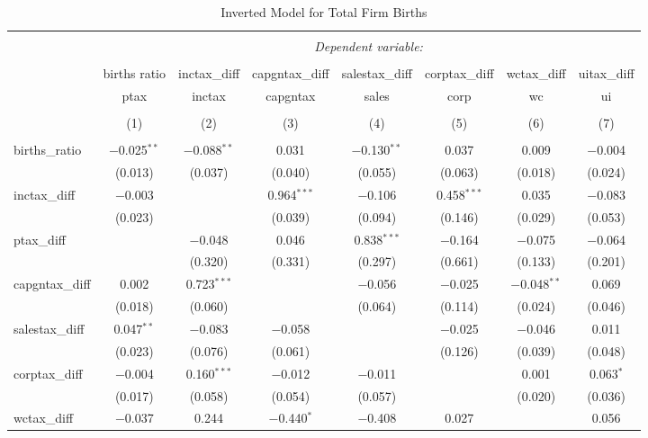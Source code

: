 
\begin{table}[!htbp] \centering 
  \caption{Inverted Model for  Total Firm Births} 
  \label{--rd} 
\footnotesize 
\begin{tabular}{@{\extracolsep{5pt}}lccccccc} 
\\[-1.8ex]\hline 
\hline \\[-1.8ex] 
 & \multicolumn{7}{c}{\textit{Dependent variable:}} \\ 
\cline{2-8} 
\\[-1.8ex] & births ratio & inctax\_diff & capgntax\_diff & salestax\_diff & corptax\_diff & wctax\_diff & uitax\_diff \\ 
 & ptax & inctax & capgntax & sales & corp & wc & ui \\ 
\\[-1.8ex] & (1) & (2) & (3) & (4) & (5) & (6) & (7)\\ 
\hline \\[-1.8ex] 
 births\_ratio & $-$0.025$^{**}$ & $-$0.088$^{**}$ & 0.031 & $-$0.130$^{**}$ & 0.037 & 0.009 & $-$0.004 \\ 
  & (0.013) & (0.037) & (0.040) & (0.055) & (0.063) & (0.018) & (0.024) \\ 
  inctax\_diff & $-$0.003 &  & 0.964$^{***}$ & $-$0.106 & 0.458$^{***}$ & 0.035 & $-$0.083 \\ 
  & (0.023) &  & (0.039) & (0.094) & (0.146) & (0.029) & (0.053) \\ 
  ptax\_diff &  & $-$0.048 & 0.046 & 0.838$^{***}$ & $-$0.164 & $-$0.075 & $-$0.064 \\ 
  &  & (0.320) & (0.331) & (0.297) & (0.661) & (0.133) & (0.201) \\ 
  capgntax\_diff & 0.002 & 0.723$^{***}$ &  & $-$0.056 & $-$0.025 & $-$0.048$^{**}$ & 0.069 \\ 
  & (0.018) & (0.060) &  & (0.064) & (0.114) & (0.024) & (0.046) \\ 
  salestax\_diff & 0.047$^{**}$ & $-$0.083 & $-$0.058 &  & $-$0.025 & $-$0.046 & 0.011 \\ 
  & (0.023) & (0.076) & (0.061) &  & (0.126) & (0.039) & (0.048) \\ 
  corptax\_diff & $-$0.004 & 0.160$^{***}$ & $-$0.012 & $-$0.011 &  & 0.001 & 0.063$^{*}$ \\ 
  & (0.017) & (0.058) & (0.054) & (0.057) &  & (0.020) & (0.036) \\ 
  wctax\_diff & $-$0.037 & 0.244 & $-$0.440$^{*}$ & $-$0.408 & 0.027 &  & 0.056 \\ 

\end{tabular}
\end{table}
